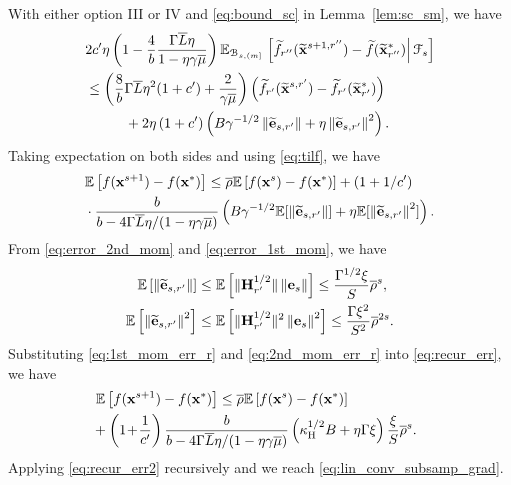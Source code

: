 \documentclass[10pt,twocolumn,journal]{IEEEtran}
\begin{document}
With either option III or IV and \eqref{eq:bound_sc} in Lemma~\ref{lem:sc_sm}, we have
\begin{align}
&2c'\eta\left(1-\frac{4}{b}\frac{\Gamma\overline{L}\eta}{1-\eta\gamma\overline{\mu}}\right)\mathbb{E}_{\mathcal{B}_{s,(m]}}\left.\left[ \widetilde{f}_{r''}(\widetilde{\mathbf{x}}^{s+1,r''})-\widetilde{f}(\widetilde{\mathbf{x}}^*_{r''})\right\vert\mathcal{F}_s\right]\nonumber\\
&\le\left(\frac{8}{b}\Gamma\overline{L}\eta^2(1+c')+\frac{2}{\gamma\overline{\mu}}\right)\left(\widetilde{f}_{r'}(\widetilde{\mathbf{x}}^{s,r'})-\widetilde{f}_{r'}(\widetilde{\mathbf{x}}_{r'}^*)\right) \nonumber\\
&\hspace{1cm}+ 2\eta\left(1+c'\right)\left(B\gamma^{-1/2} \left\Vert\widetilde{\mathbf{e}}_{s,r'}\right\Vert+\eta\left\Vert\widetilde{\mathbf{e}}_{s,r'}\right\Vert^2\right).
\end{align}
Taking expectation on both sides and using \eqref{eq:tilf}, we have
\begin{align}
&\mathbb{E}\left[f(\mathbf{x}^{s+1})-f(\mathbf{x}^*)\right] \le \overline{\rho}\mathbb{E}\left[f(\mathbf{x}^s)-f(\mathbf{x}^*)\right]+\left(1+{1}/{c'}\right) \nonumber\\
&\cdot\frac{b}{b-{4\Gamma\overline{L}\eta}/{(1-\eta\gamma\overline{\mu})}}\left(B\gamma^{-1/2} \mathbb{E}[\left\Vert\widetilde{\mathbf{e}}_{s,r'}\right\Vert]+\eta\mathbb{E}[\left\Vert\widetilde{\mathbf{e}}_{s,r'}\right\Vert^2]\right). \label{eq:recur_err}
\end{align}
From \eqref{eq:error_2nd_mom} and \eqref{eq:error_1st_mom}, we have
\begin{align}
\mathbb{E}\left[\left\Vert\widetilde{\mathbf{e}}_{s,r'}\right\Vert\right] &\le \mathbb{E}\left[\Vert\mathbf{H}^{1/2}_{r'}\Vert\left\Vert\mathbf{e}_{s}\right\Vert\right] \le \frac{\Gamma^{1/2}\xi}{S}\overline{\rho}^{s},\label{eq:1st_mom_err_r}\\
\mathbb{E}\left[\left\Vert\widetilde{\mathbf{e}}_{s,r'}\right\Vert^2\right] &\le \mathbb{E}\left[\Vert\mathbf{H}^{1/2}_{r'}\Vert^2\left\Vert\mathbf{e}_{s}\right\Vert^2\right] \le {\frac{\Gamma \xi^2}{S^2}}\overline{\rho}^{2s}.\label{eq:2nd_mom_err_r}
\end{align}
Substituting \eqref{eq:1st_mom_err_r} and \eqref{eq:2nd_mom_err_r} into \eqref{eq:recur_err}, we have
\begin{align}
&\hspace{-.2cm}\bbE\left[f(\bx^{s+1})-f(\bx^*)\right] %
\le \barrho\bbE\left[f(\bx^s)-f(\bx^*)\right]\nn\\
&\hspace{-.3cm} +  \left(1\!+\!\frac{1}{c'}\right)\frac{b}{b-{4\Gamma\barL\eta}/{(1-\eta\gamma\barmu)}}\left(\kappa_\rmH^{1/2}B+{\eta\Gamma \xi}\right)\frac{\xi}{S}\barrho^{s}.\label{eq:recur_err2}
\end{align}
Applying \eqref{eq:recur_err2} recursively and we reach \eqref{eq:lin_conv_subsamp_grad}.
\end{document}
